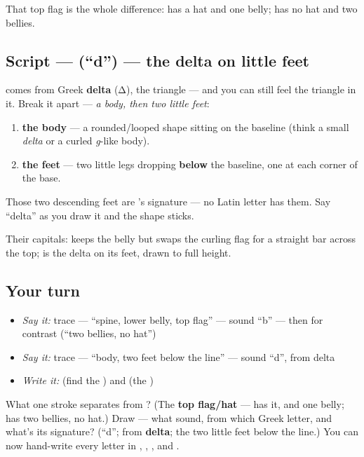 That top flag is the whole difference: \textbf{} has a hat and one belly; \textbf{} has no hat and two bellies.

\subsection*{Script —  (\textquotedblleft{}d\textquotedblright{}) — the delta on little feet}
\textbf{} comes from Greek \textbf{delta} (Δ), the triangle — and you can still feel the triangle in it. Break it apart — \emph{a body, then two little feet}:

\begin{enumerate}
\raggedright
  \item \textbf{the body} — a rounded/looped shape sitting on the baseline (think a small \emph{delta} or a curled \emph{g}-like body).
  \item \textbf{the feet} — two little legs dropping \textbf{below} the baseline, one at each corner of the base.
\end{enumerate}

Those two descending feet are \textbf{}'s signature — no Latin letter has them. Say \textquotedblleft{}delta\textquotedblright{} as you draw it and the shape sticks.

Their capitals: \textbf{} keeps the belly but swaps the curling flag for a straight bar across the top; \textbf{} is the delta on its feet, drawn to full height.

\subsection*{Your turn}
\begin{itemize}
\raggedright
  \item \emph{Say it:} trace  — \textquotedblleft{}spine, lower belly, top flag\textquotedblright{} — sound \textquotedblleft{}b\textquotedblright{} — then  for contrast (\textquotedblleft{}two bellies, no hat\textquotedblright{})
  \item \emph{Say it:} trace  — \textquotedblleft{}body, two feet below the line\textquotedblright{} — sound \textquotedblleft{}d\textquotedblright{}, from delta
  \item \emph{Write it:} \emph{} (find the ) and \emph{} (the )
\end{itemize}

\begin{tcolorbox}[breakable,colback=teal!4,colframe=teal!35!black,title={Before you move on}]
What one stroke separates \textbf{} from \textbf{}? (The \textbf{top flag/hat} —  has it, and one belly;  has two bellies, no hat.) Draw \textbf{} — what sound, from which Greek letter, and what's its signature? (\textquotedblleft{}d\textquotedblright{}; from \textbf{delta}; the two little feet below the line.) You can now hand-write every letter in \emph{}, \emph{}, \emph{}, and \emph{}.
\end{tcolorbox}
